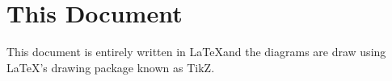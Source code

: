 \documentclass[../../main]{subfiles}
\begin{document}
\section{This Document} \label{sec:}

This document is entirely written in \LaTeX and the diagrams are draw using \LaTeX's
drawing package known as TikZ.
\end{document}
